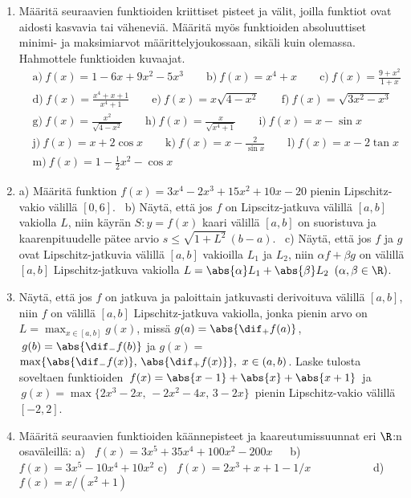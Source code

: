 \Harj
\begin{enumerate}

\item
Määritä seuraavien funktioiden kriittiset pisteet ja välit, joilla funktiot ovat aidosti
kasvavia tai väheneviä. Määritä myös funktioiden absoluuttiset minimi- ja maksimiarvot
määrittelyjoukossaan, sikäli kuin olemassa. Hahmottele funktioiden kuvaajat.
\begin{align*}
&\text{a)}\ f(x)=1-6x+9x^2-5x^3 \qquad
 \text{b)}\ f(x)=x^4+x \qquad
 \text{c)}\ f(x)=\frac{9+x^2}{1+x} \\
&\text{d)}\ f(x)=\frac{x^4+x+1}{x^4+1} \qquad 
 \text{e)}\ f(x)=x\sqrt{4-x^2} \qquad
 \text{f)}\ f(x)=\sqrt{3x^2-x^3} \\
&\text{g)}\ f(x)=\frac{x^2}{\sqrt{4-x^2}} \qquad
 \text{h)}\ f(x)=\frac{x}{\sqrt{x^4+1}} \qquad
 \text{i)}\ f(x)=x-\sin x \\
&\text{j)}\ f(x)=x+2\cos x \qquad
 \text{k)}\ f(x)=x-\frac{2}{\sin x} \qquad
 \text{l)}\ f(x)=x-2\tan x \\
&\text{m)}\ f(x)=1-\frac{1}{2}x^2-\cos x
\end{align*}

\item
a) Määritä funktion $f(x)=3x^4-2x^3+15x^2+10x-20$ pienin Lipschitz-vakio välillä $[0,6]$. \
b) Näytä, että jos $f$ on Lipscitz-jatkuva välillä $[a,b]$ vakiolla $L$, niin käyrän
$S: y=f(x)$ kaari välillä $[a,b]$ on suoristuva ja kaarenpituudelle pätee arvio
$s \le \sqrt{1+L^2}\,(b-a)$. \ c) Näytä, että jos $f$ ja $g$ ovat Lipschitz-jatkuvia
välillä $[a,b]$ vakioilla $L_1$ ja $L_2$, niin $\alpha f+\beta g$ on välillä $[a,b]$
Lipschitz-jatkuva vakiolla $L=\abs{\alpha}L_1+\abs{\beta}L_2$ $(\alpha,\beta\in\R)$.

\item \label{H-V-6: Lipschitz-kriteeri}
Näytä, että jos $f$ on jatkuva ja paloittain jatkuvasti derivoituva välillä $[a,b]$, niin
$f$ on välillä $[a,b]$ Lipschitz-jatkuva vakiolla, jonka pienin arvo on
$L=\max_{x\in[a,b]} g(x)$, missä $g(a)=\abs{\dif_+f(a)}$, $\,g(b)=\abs{\dif_-f(b)}$ ja
$g(x)=$ $\max\{\abs{\dif_-f(x)},\,\abs{\dif_+f(x)}\},\ x\in(a,b)$.
Laske tulosta soveltaen funktioiden $\,f(x)=\abs{x-1}+\abs{x}+\abs{x+1}\,$ ja
$\,g(x)=\max\{2x^3-2x,\,-2x^2-4x,\,3-2x\}\,$ pienin Lipschitz-vakio välillä $[-2,2]$.

\item
Määritä seuraavien funktioiden käännepisteet ja kaareutumissuunnat eri $\R$:n
osaväleillä: \vspace{1mm}\newline
a) \ $f(x)=3x^5+35x^4+100x^2-200x\ \quad$   b) \ $f(x)=3x^5-10x^4+10x^2$ \newline
c) \ $f(x)=2x^3+x+1-1/x\ \qquad\qquad\quad$ d) \ $f(x)=x/(x^2+1)$


\end{enumerate}

